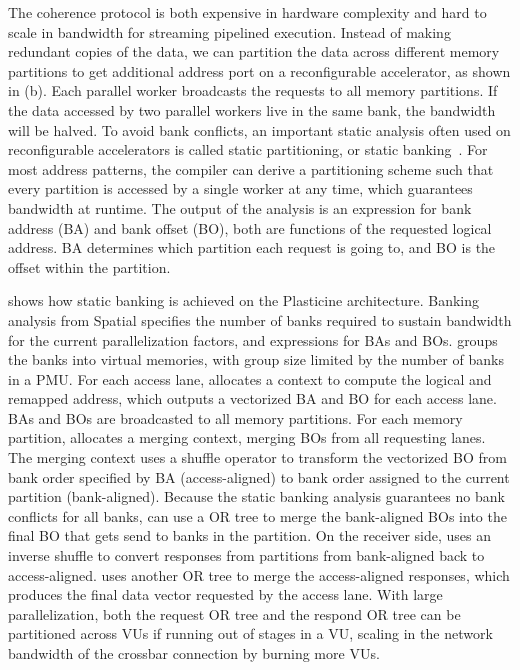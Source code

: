 The coherence protocol is both expensive in hardware complexity and hard to scale in bandwidth for
streaming pipelined execution.
Instead of making redundant copies of the data, we can partition the data across different memory
partitions to get additional address port on a reconfigurable accelerator, as shown in
 (b).
Each parallel worker broadcasts the requests to all memory partitions.
If the data accessed by two parallel workers live in the same bank, the bandwidth will be halved.
To avoid bank conflicts, an important static analysis often used on reconfigurable accelerators is called static partitioning, or static banking~\cite{poly_cong}.
For most address patterns, the compiler can derive a partitioning scheme such that every partition is accessed by a
single worker at any time, which guarantees bandwidth at runtime.
The output of the analysis is an expression for bank address (BA) and bank offset (BO), both are
functions of the requested logical address.
BA determines which partition each request is going to, and BO is the offset within the
partition.

 shows how static banking is achieved on the Plasticine architecture.
Banking analysis from Spatial specifies the number of banks required to sustain bandwidth for the
current parallelization factors, and expressions for BAs and BOs. 
\name groups the banks into virtual memories, with group size limited by the number of banks in a PMU.
For each access lane, \name allocates a context to compute the logical and remapped address, which
outputs a vectorized BA and BO for each access lane. BAs and BOs are broadcasted to all memory partitions.
For each memory partition, \name allocates a merging context, merging BOs from all requesting lanes.
The merging context uses a shuffle operator to transform the vectorized BO from bank order specified by BA
(access-aligned) to bank order assigned to the current partition (bank-aligned).
Because the static banking analysis guarantees no bank conflicts for all banks,
\name can use a OR tree to merge the bank-aligned BOs into the final BO that gets send to
banks in the partition. On the receiver side, \name uses an inverse shuffle to convert responses from
partitions from bank-aligned back to access-aligned.
\name uses another OR tree to merge the access-aligned responses, which produces the final data
vector requested by the access lane.
With large parallelization, both the request OR tree and the respond OR tree can be
partitioned across VUs if running out of stages in a VU, scaling in the network bandwidth of the
crossbar connection by burning more VUs.

